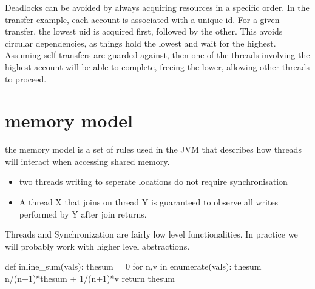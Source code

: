 Deadlocks can be avoided by always acquiring resources in a specific order. In the transfer example, each account is associated with a unique id. For a given transfer, the lowest uid is acquired first, followed by the other. This avoids circular dependencies, as things hold the lowest and wait for the highest. Assuming self-transfers are guarded against, then one of the threads involving the highest account will be able to complete, freeing the lower, allowing other threads to proceed. 

\section{memory model}
the memory model is a set of rules used in the JVM that describes how threads will interact when accessing shared memory.

\begin{itemize}
    \item two threads writing to seperate locations do not require synchronisation
    \item A thread X that joins on thread Y is guaranteed to observe all writes performed by Y after join returns.
\end{itemize}

Threads and Synchronization are fairly low level functionalities. In practice we will probably work with higher level abstractions.


def inline_sum(vals):
    thesum = 0
    for n,v in enumerate(vals):
    thesum = n/(n+1)*thesum + 1/(n+1)*v
    return thesum

